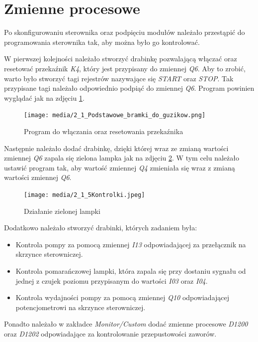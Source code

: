 \documentclass{article}
\begin{document}
\newpage
\section{Zmienne procesowe}
Po skonfigurowaniu sterownika oraz podpięciu modułów należało przestąpić do programowania sterownika tak, aby można było go kontrolować. 

W pierwszej kolejności należało stworzyć drabinkę pozwalającą włączać oraz resetować przekaźnik \textit{K4}, który jest przypisany do zmiennej \textit{Q6}. Aby to zrobić, warto było stworzyć tagi rejestrów nazywające się \textit{START} oraz \textit{STOP}. Tak przypisane tagi należało odpowiednio podpiąć do zmiennej \textit{Q6}. Program powinien wyglądać jak na zdjęciu \ref{fig:zdj9}.

\begin{figure}[H]
    \centering
    \texttt{[image: media/2\_1\_Podstawowe\_bramki\_do\_guzikow.png]}
    \caption{Program do włączania oraz resetowania przekaźnika}
    \label{fig:zdj9}
\end{figure}

Następnie należało dodać drabinkę, dzięki której wraz ze zmianą wartości zmiennej \textit{Q6} zapala się zielona lampka jak na zdjęciu \ref{fig:zdj10}. W tym celu należało ustawić program tak, aby wartość zmiennej \textit{Q4} zmieniała się wraz z zmianą wartości zmiennej \textit{Q6}. 

\begin{figure}[H]
    \centering
    \texttt{[image: media/2\_1\_5Kontrolki.jpeg]}
    \caption{Działanie zielonej lampki}
    \label{fig:zdj10}
\end{figure}

Dodatkowo należało stworzyć drabinki, których zadaniem była:
\begin{itemize}
    \item Kontrola pompy za pomocą zmiennej \textit{I13} odpowiadającej za przełącznik na skrzynce sterowniczej.
    \item Kontrola pomarańczowej lampki, która zapala się przy dostaniu sygnału od jednej z czujek poziomu przypisanym do wartości \textit{I03} oraz \textit{I04}.
    \item Kontrola wydajności pompy za pomocą zmiennej \textit{Q10} odpowiadającej potencjometrowi na skrzynce sterowniczej.
\end{itemize}

Ponadto należało w zakładce \textit{Monitor/Custom} dodać zmienne procesowe \textit{D1200} oraz \textit{D1202} odpowiadające za kontrolowanie przepustowości zaworów.
\end{document}
